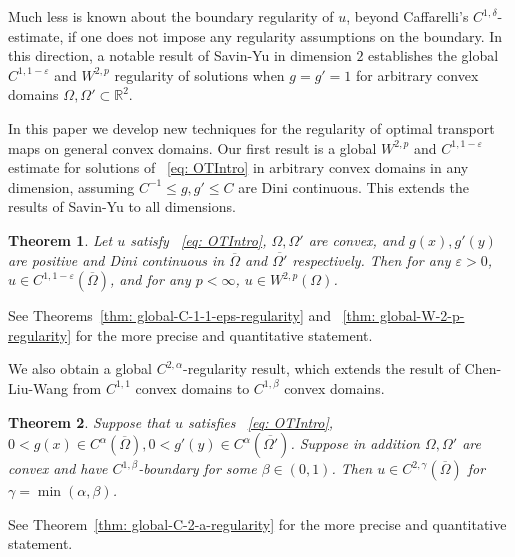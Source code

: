 \documentclass[12pt,reqno]{amsart}
\newtheorem{theorem}{Theorem}[section]
\newcommand{\eps}{\varepsilon}
\numberwithin{equation}{section}
\begin{document}
Much less is known about the boundary regularity of $u$, beyond Caffarelli's $C^{1, \delta}$-estimate, if one does not impose any regularity assumptions on the boundary. In this direction, a notable result of Savin-Yu \cite{Savin-Yu} in dimension $2$ establishes the global $C^{1,1-\eps}$ and $W^{2,p}$ regularity of solutions when $g=g'=1$ for arbitrary convex domains $\Omega, \Omega' \subset \mathbb R^2$. 

In this paper we develop new techniques for the regularity of optimal transport maps on general convex domains. Our first result is a global $W^{2,p}$ and $C^{1,1-\eps}$ estimate for solutions of ~\eqref{eq: OTIntro} in arbitrary convex domains in any dimension, assuming $C^{-1}\leq g,g'\leq C$ are Dini continuous. This extends the results of Savin-Yu \cite{Savin-Yu} to all dimensions. 
\begin{theorem}\label{thm: INTROC1aW2pregularity}
	   Let $u$ satisfy ~\eqref{eq: OTIntro}, $\Omega, \Omega'$ are convex, and $g(x), g'(y)$ are positive and Dini continuous in $\overline{\Omega}$ and $\overline{\Omega'}$ respectively. Then for any $\eps>0$, $u\in C^{1, 1-\eps}(\overline\Omega)$, and for any $p<\infty$, $u\in W^{2, p}(\Omega)$. 
\end{theorem}
See Theorems~\ref{thm: global-C-1-1-eps-regularity} and ~\ref{thm: global-W-2-p-regularity} for the more precise and quantitative statement.

We also obtain a global $C^{2,\alpha}$-regularity result, which extends the result of Chen-Liu-Wang \cite{Chen-Liu-Wang} from $C^{1,1}$ convex domains to $C^{1,\beta}$ convex domains. 
\begin{theorem}\label{thm: INTRO-C-2-a-regularity}
        Suppose that $u$ satisfies ~\eqref{eq: OTIntro}, $0<g(x)\in C^{\alpha}(\overline{\Omega}), 0<g'(y)\in C^{\alpha}(\overline{\Omega'})$. Suppose in addition $\Omega, \Omega'$ are convex and have $C^{1, \beta}$-boundary for some $\beta\in(0, 1)$. Then $u\in C^{2, \gamma}(\overline\Omega)$ for $\gamma = \min(\alpha, \beta)$.
\end{theorem}
See Theorem~\ref{thm: global-C-2-a-regularity} for the more precise and quantitative statement. 
\end{document}
